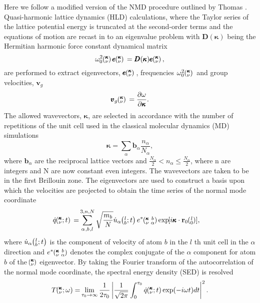 \documentclass[aps,prb,preprint,preprintnumbers,amsmath,amssymb,floatfix,superscriptaddress]{revtex4}
\newcommand{\EXP}[1]{\exp\mspace{-5.0mu}\left[#1\right]\mspace{-3.0mu}}
\newcommand{\SUM}[2]{\ifthenelse{\equal{#1}{0}}{\sum_{
\alpha_{#2},b_{#2},l_{#2}}^{3,n,N}} {\ifthenelse{\equal{#1}{1}}{\sum_{
\alpha_{#2},b_{#2}}^{3,n}}{\sum_{\pmb{\kappa}#2,\nu#2}^{N,3n}}}}
\newcommand{\ab}[2]{\mspace{-4.0mu}\left(\mspace{-8.0mu}
\begin{smallmatrix}&\ifthenelse{\equal{#1}{}}{a}{#1} \\&\ifthenelse
{\equal{#2}{}}{b}{#2}\end{smallmatrix}\mspace{-3.0mu}\right)}
\newcommand{\kvba}{\mspace{-4.0mu}\left(\mspace{-8.0mu}
\begin{smallmatrix} &\pmb{\kappa} &b \\ &\nu &\alpha\end{smallmatrix}
\mspace{-3.0mu}\right)}
\newcommand{\kvt}{\mspace{-4.0mu}\left(\mspace{-8.0mu}
\begin{smallmatrix}&\pmb{\kappa} \\&\nu\end{smallmatrix}
\mspace{-2.0mu};t\right)}
\newcommand{\kvw}{\mspace{-4.0mu}\left(\mspace{-8.0mu}
\begin{smallmatrix}&\pmb{\kappa} \\&\nu\end{smallmatrix}
\mspace{-2.0mu};\omega\right)}
\newcommand{\kv}{\mspace{-4.0mu}\left(\mspace{-8.0mu}
\begin{smallmatrix}&\pmb{\kappa} \\&\nu\end{smallmatrix}
\mspace{-3.0mu}\right)}
\newcommand{\lbt}{\mspace{-4.0mu}\left(\mspace{-8.0mu}
\begin{smallmatrix}&l \\&b\end{smallmatrix}\mspace{-2.0mu};t\right)}
\begin{document}
Here we follow a modified version of the NMD procedure outlined by Thomas \cite {PhysRevB.81.081411}. Quasi-harmonic lattice dynamics (HLD) calculations, where the Taylor series of the lattice potential energy is truncated at the second-order terms and the equations of motion are recast in to an eigenvalue problem with $\pmb{D}(\pmb{\kappa})$ being the Hermitian harmonic force constant dynamical matrix \cite{dove_introduction_1993-3}
\begin{equation}\label{EQ:LD}
\omega^2_0 \kv {} \pmb{e} \kv {}=\pmb{D}(\pmb{\kappa}) \pmb{e} \kv{},
\end{equation}
are performed to extract eigenvectors, $\pmb{e} \kv{}$, frequencies $\omega^2_0 \kv {}$ and group velocities, $\pmb{v}_{g}$
\begin{equation}\label{EQ:VG}
\pmb{v}_{g}\kv{}=\frac{\partial \omega}{\partial \pmb{\kappa}}.
\end{equation}
The allowed wavevectors, $\pmb{\kappa}$, are selected in accordance with the number of repetitions of the unit cell used in the classical molecular dynamics (MD) simulations 
\begin{equation}\label{EQ:NMD:allowdkpt}
\pmb{\kappa} = \sum_{\alpha} \pmb{b}_{\alpha} \frac{n_{\alpha}}{N_{\alpha}},
\end{equation}
where $\pmb{b}_\alpha$ are the reciprocal lattice vectors and $ \frac{N_\alpha}{2} < n_\alpha \le \frac {N_\alpha}{2}$, where n are integers and N are now constant even integers. The wavevectors are taken to be in the first Brillouin zone. The eigenvectors are used to construct a basis upon which the velocities are projected to obtain the time series of the normal mode coordinate 
\begin{equation}\label{EQ:NMD:qdot}
\begin{split}
\dot{q}\kvt{}{}{}=&\SUM{0}{}\sqrt{\frac{m_b}{N}}\dot{u}_{\alpha}\lbt e^*\kvba\EXP{i\pmb{\kappa}\cdot\mathbf{r}_0\ab{l}{0}},
\end{split}
\end{equation}
where $\dot{u}_{\alpha}\lbt$ is the component of velocity of atom $b$ in the $l$ th unit cell in the $\alpha$ direction and $e^*\kvba$ denotes the complex conjugate of the $\alpha$ component for atom $b$ of the $\kv$ eigenvector. By taking the Fourier transform of the autocorrelation of the normal mode coordinate, the spectral energy density (SED) is resolved \cite{dove_introduction_1993-3}
\begin{equation}\label{EQ:NMD:SED}
\begin{split}
T\kvw=&\lim_{\tau_0\rightarrow\infty}\frac{1}{2\tau_0}\left|\frac{1}{\sqrt{2\pi}}\int_{0}^{\tau_0}\dot{q}\kvt\exp(-i\omega t)dt\right|^2.\\
\end{split}
\end{equation}
\end{document}

